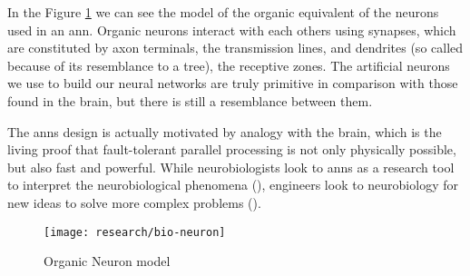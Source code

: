 In the Figure \ref{fig:org_neuron} we can see the model of the organic equivalent of the neurons used in an \gls{ann}. Organic neurons interact with each others using synapses, which are constituted by axon terminals, the transmission lines, and dendrites (so called because of its resemblance to a tree), the receptive zones. The artificial neurons we use to build our neural networks are truly primitive in comparison with those found in the brain, but there is still a resemblance between them.

\clearpage

The \glspl{ann} design is actually motivated by analogy with the brain, which is the living proof that fault-tolerant parallel processing is not only physically possible, but also fast and powerful. While neurobiologists look to \glspl{ann} as a research tool to interpret the neurobiological phenomena (\cite{anastasio1993}), engineers look to neurobiology for new ideas to solve more complex problems (\cite{mead1989}).

\begin{figure}[!ht]
	\centering
	\texttt{[image: research/bio-neuron]}
	\caption{Organic Neuron model}
	\label{fig:org_neuron}
\end{figure}





